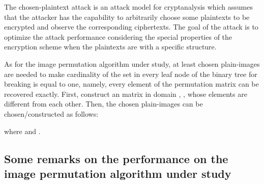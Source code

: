 \documentclass[3p,preprint,11pt]{elsarticle}
\begin{document}
The chosen-plaintext attack is an attack model for cryptanalysis
which assumes that the attacker has the capability to arbitrarily
choose some plaintexts to be encrypted and observe the corresponding
ciphertexts. The goal of the attack is to optimize the attack
performance considering the special properties of the encryption scheme
when the plaintexts are with a specific structure.

As for the image permutation algorithm under study, at least
 chosen
plain-images are needed to make cardinality of the set in every leaf
node of the binary tree for breaking is equal to one, namely, every
element of the permutation matrix can be recovered exactly. First,
construct an  matrix in domain ,
, whose elements are
different from each other. Then, the chosen plain-images
 can be chosen/constructed as follows:

where  and
.

\subsection{Some remarks on the performance on the image permutation algorithm under study}
\end{document}

